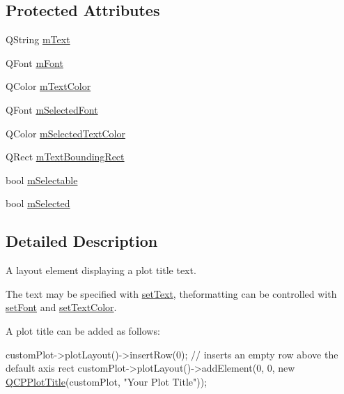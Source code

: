 \subsection*{Protected Attributes}
\begin{DoxyCompactItemize}
\item 
Q\-String \hyperlink{class_q_c_p_plot_title_a0d961bfac1211d59d3b0bc30d35f6379}{m\-Text}
\item 
Q\-Font \hyperlink{class_q_c_p_plot_title_ad9e2c2a2e941f3444cb692a51df0df62}{m\-Font}
\item 
Q\-Color \hyperlink{class_q_c_p_plot_title_a5d7f834d6522c1a72fb0682c0b7ebe13}{m\-Text\-Color}
\item 
Q\-Font \hyperlink{class_q_c_p_plot_title_a95003186c39bbab902873a8ef4cbb547}{m\-Selected\-Font}
\item 
Q\-Color \hyperlink{class_q_c_p_plot_title_a8b9760e62af92814c4effdd7ad69c5f9}{m\-Selected\-Text\-Color}
\item 
Q\-Rect \hyperlink{class_q_c_p_plot_title_a7178a0f6c1e633c144c17b4de4e0b840}{m\-Text\-Bounding\-Rect}
\item 
bool \hyperlink{class_q_c_p_plot_title_aadefb5e2b19b1cc7deda0a55ec747884}{m\-Selectable}
\item 
bool \hyperlink{class_q_c_p_plot_title_afef1342a20f5ca985a20b9cfdc03d815}{m\-Selected}
\end{DoxyCompactItemize}


\subsection{Detailed Description}
A layout element displaying a plot title text. 

The text may be specified with \hyperlink{class_q_c_p_plot_title_aae5a93e88050dfb2cbf6adc087516821}{set\-Text}, theformatting can be controlled with \hyperlink{class_q_c_p_plot_title_a199fc7170802ea65006c371875349e37}{set\-Font} and \hyperlink{class_q_c_p_plot_title_a71273e3a0ca6b4c151591b37b9e5ce33}{set\-Text\-Color}.

A plot title can be added as follows\-: 
\begin{DoxyCode}
customPlot->plotLayout()->insertRow(0); \textcolor{comment}{// inserts an empty row above the default axis rect}
customPlot->plotLayout()->addElement(0, 0, \textcolor{keyword}{new} \hyperlink{class_q_c_p_plot_title_aaae17bee2de6d6a1e695f76fb1abed03}{QCPPlotTitle}(customPlot, \textcolor{stringliteral}{"Your Plot Title"}));
\end{DoxyCode}


